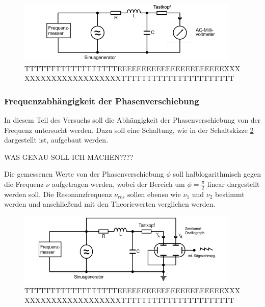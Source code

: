 \begin{figure}[H]
  \centering
  \includegraphics{content/aufgabeC.png}
  \caption{TTTTTTTTTTTTTTTTTTEEEEEEEEEEEEEEEEEEEEEEXXXXXXXXXXXXXXXXXXXXXTTTTTTTTTTTTTTTTTTTTTT}
  \label{fig:gsk4}
\end{figure}


\subsubsection{Frequenzabhängigkeit der Phasenverschiebung}

In diesem Teil des Versuchs soll die Abhängigkeit der Phasenverschiebung von der Frequenz untersucht werden.
Dazu soll eine Schaltung, wie in der Schaltskizze \ref{fig:gsk5} dargestellt ist, aufgebaut werden.



WAS GENAU SOLL ICH MACHEN????

Die gemessenen Werte von der Phasenverschiebung $\phi$ soll halblogarithmisch gegen die Frequenz $\nu$
aufgetragen werden, wobei der Bereich um $\phi = \frac{\pi}{2}$ linear dargestellt werden soll.
Die Resonanzfrequenz $\nu_{res}$ sollen ebenso wie $\nu_1$ und $\nu_2$ bestimmt werden und anschließend
mit den Theoriewerten verglichen werden. 

\begin{figure}[H]
  \centering
  \includegraphics{content/aufgabeD.png}
  \caption{TTTTTTTTTTTTTTTTTTEEEEEEEEEEEEEEEEEEEEEEXXXXXXXXXXXXXXXXXXXXXTTTTTTTTTTTTTTTTTTTTTT}
  \label{fig:gsk5}
\end{figure}
